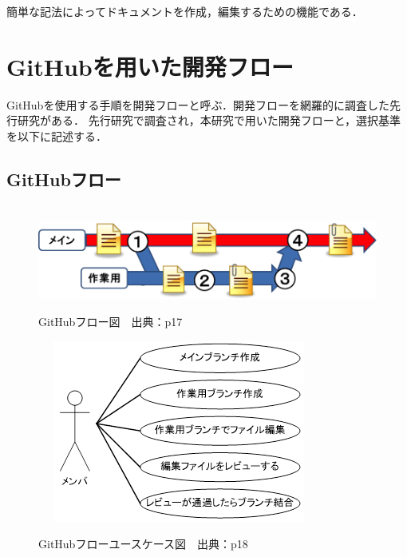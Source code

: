 簡単な記法によってドキュメントを作成，編集するための機能である．






\section{GitHubを用いた開発フロー}
GitHubを使用する手順を開発フローと呼ぶ．開発フローを網羅的に調査した先行研究がある．
先行研究で調査され，本研究で用いた開発フローと，選択基準を以下に記述する．

\subsection{GitHubフロー}

\begin{figure}[H]
\centering　
\includegraphics[width=13cm]{github.png}
\caption{GitHubフロー図　出典：\cite{onodera2015}p17}\label{tab:githubフロー}
\end{figure}
\begin{figure}[H]
\centering　
\includegraphics{githubyou.png}
\caption{GitHubフローユースケース図　出典：\cite{onodera2015}p18}\label{tab:githubyou}
\end{figure}
